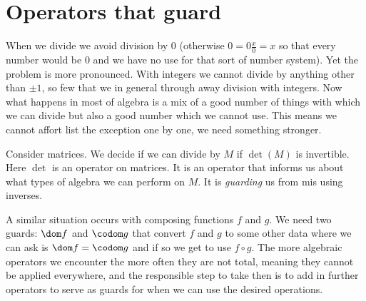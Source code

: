 \section{Operators that guard}
When we divide we avoid division by $0$ (otherwise $0=0\frac{x}{0}=x$ so that every number
would be $0$ and we have no use for that sort of number system).  
Yet the problem is more pronounced.  With integers we cannot divide by anything other 
than $\pm 1$, so few that we in general through away division with integers.  
Now what happens in most of algebra is a mix of a good number of things with which we can 
divide but also a good number which we cannot use.  This means we cannot affort list 
the exception one by one, we need something stronger.

Consider matrices.  We decide if we can divide by $M$ if $\det(M)$ is invertible.
Here $\det$ is an operator on matrices.  It is an operator that informs us about 
what types of algebra we can perform on $M$.  It is \emph{guarding} us from mis using 
inverses.

A similar situation occurs with composing functions $f$ and $g$.  We need 
two guards: $\dom f$ and $\codom g$ that convert $f$ and $g$ to some other data 
where we can ask is $\dom f=\codom g$ and if so we get to use $f\circ g$.
The more algebraic operators we encounter the more often they are not total, 
meaning they cannot be applied everywhere, and the responsible step to take 
then is to add in further operators to serve as guards for when we can use the 
desired operations.